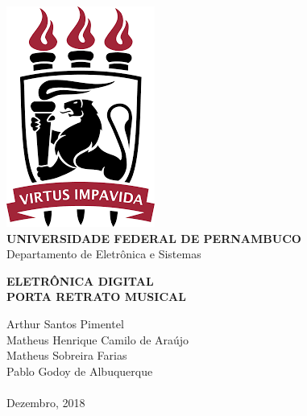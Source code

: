 \documentclass[14pt, oneside]{book}
\date{\vspace{-5ex}}
\theoremstyle{definition}
\begin{document}

    \begin{titlepage}
        \centering 
        \includegraphics[scale = 0.8]{ufpe.png} \\
        \Large{\textbf{UNIVERSIDADE FEDERAL DE PERNAMBUCO}}\\
        \large{Departamento de Eletrônica e Sistemas}
   
        \Huge\textbf{ELETRÔNICA DIGITAL}\\
        \Large\textbf{PORTA RETRATO MUSICAL}
   
        \vfill
        \Large{Arthur Santos Pimentel} \\
        \Large{Matheus Henrique Camilo de Araújo} \\
        \Large{Matheus Sobreira Farias} \\
        \Large{Pablo Godoy de Albuquerque}
        \\~\\
        \Large{Dezembro, 2018}
    \end{titlepage}

\tableofcontents
\mainmatter
\end{document}
